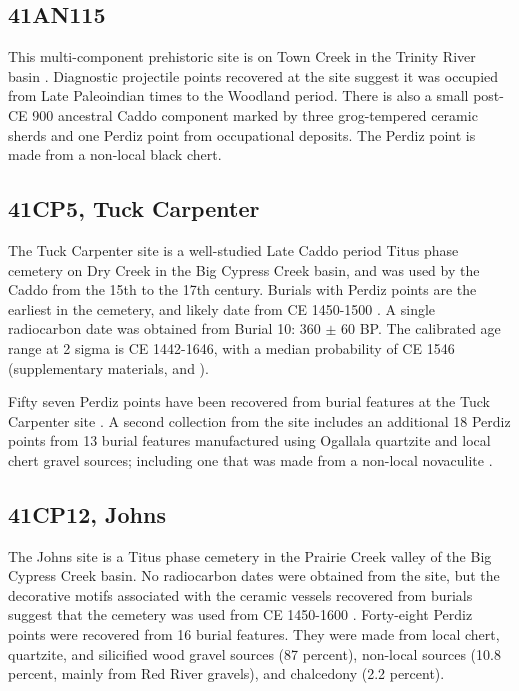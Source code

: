 \documentclass[review]{elsarticle}
\begin{document}
\subsection*{41AN115}

This multi-component prehistoric site is on Town Creek in the Trinity River basin \citep{RN8982}. Diagnostic projectile points recovered at the site suggest it was occupied from Late Paleoindian times to the Woodland period. There is also a small post-CE 900 ancestral Caddo component marked by three grog-tempered ceramic sherds and one Perdiz point from occupational deposits. The Perdiz point is made from a non-local black chert.

\subsection*{41CP5, Tuck Carpenter}

The Tuck Carpenter site is a well-studied Late Caddo period Titus phase cemetery on Dry Creek in the Big Cypress Creek basin, and was used by the Caddo from the 15th to the 17th century. Burials with Perdiz points are the earliest in the cemetery, and likely date from CE 1450-1500 \citep[197]{RN8962}. A single radiocarbon date was obtained from Burial 10: 360 $\pm$ 60 BP. The calibrated age range at 2 sigma is CE 1442-1646, with a median probability of CE 1546 (supplementary materials, and \citet{RN8980}).

Fifty seven Perdiz points have been recovered from burial features at the Tuck Carpenter site \citep{RN8963,RN3158,RN3159}. A second collection from the site includes an additional 18 Perdiz points from 13 burial features manufactured using Ogallala quartzite and local chert gravel sources; including one that was made from a non-local novaculite \citep[Table 2]{RN8962}.

\subsection*{41CP12, Johns}

The Johns site is a Titus phase cemetery in the Prairie Creek valley of the Big Cypress Creek basin. No radiocarbon dates were obtained from the site, but the decorative motifs associated with the ceramic vessels recovered from burials suggest that the cemetery was used from CE 1450-1600 \citep{RN2440}. Forty-eight Perdiz points were recovered from 16 burial features. They were made from local chert, quartzite, and silicified wood gravel sources (87 percent), non-local sources (10.8 percent, mainly from Red River gravels), and chalcedony (2.2 percent).
\end{document}
